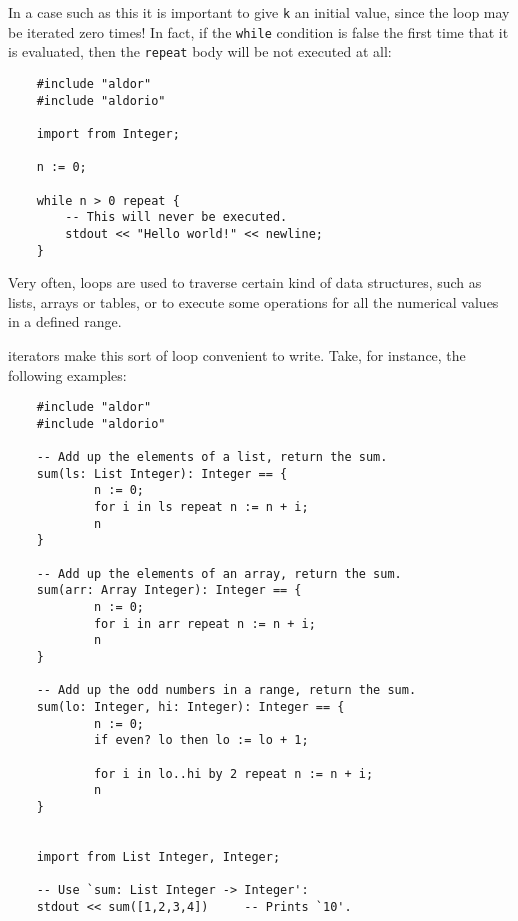 In a case such as this it is important to give \verb"k" an initial value,
since the loop may be iterated zero times!
In fact, if the {\tt while} condition is false the first time that it is
evaluated, then the {\tt repeat} body will be not executed at all:

\begin{small}%
\begin{verbatim}
    #include "aldor"
    #include "aldorio"

    import from Integer;

    n := 0;

    while n > 0 repeat {
        -- This will never be executed.
        stdout << "Hello world!" << newline;
    }
\end{verbatim}
\end{small}



Very often, loops are used to traverse certain kind of data structures,
such as lists, arrays or tables, or to execute some operations for all
the numerical values in a defined range.

{} iterators make this sort of loop convenient to write.
Take, for instance, the following examples:

\begin{small}
\begin{verbatim}
    #include "aldor"
    #include "aldorio"

    -- Add up the elements of a list, return the sum.
    sum(ls: List Integer): Integer == {
            n := 0;
            for i in ls repeat n := n + i;
            n
    }

    -- Add up the elements of an array, return the sum.
    sum(arr: Array Integer): Integer == {
            n := 0;
            for i in arr repeat n := n + i;
            n
    }

    -- Add up the odd numbers in a range, return the sum.
    sum(lo: Integer, hi: Integer): Integer == {
            n := 0;
            if even? lo then lo := lo + 1;

            for i in lo..hi by 2 repeat n := n + i;
            n
    }


    import from List Integer, Integer;

    -- Use `sum: List Integer -> Integer':
    stdout << sum([1,2,3,4])     -- Prints `10'.

\end{verbatim}
\end{small}

